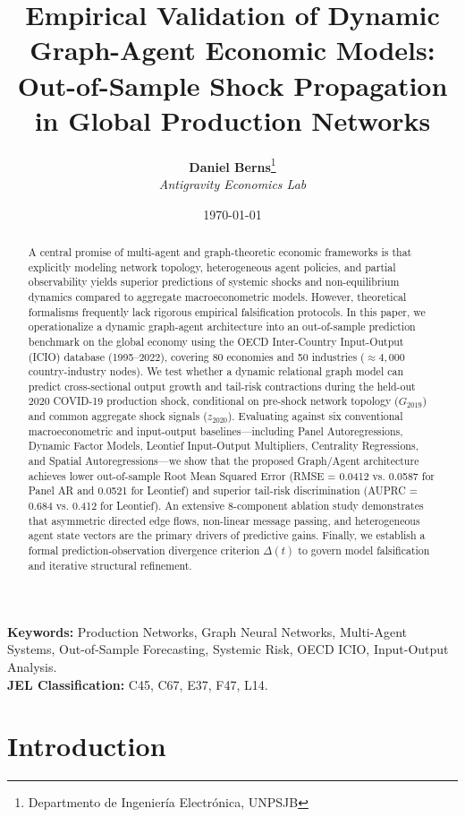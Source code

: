 \documentclass[11pt,a4paper]{article}
\title{\textbf{Empirical Validation of Dynamic Graph-Agent Economic Models:\\ Out-of-Sample Shock Propagation in Global Production Networks}}
\author{\textbf{Daniel Berns}\thanks{Departmento de Ingeniería Electrónica, UNPSJB} \\ \textit{Antigravity Economics Lab}}
\date{\today}
\begin{document}
\maketitle

\begin{abstract}
\noindent A central promise of multi-agent and graph-theoretic economic frameworks is that explicitly modeling network topology, heterogeneous agent policies, and partial observability yields superior predictions of systemic shocks and non-equilibrium dynamics compared to aggregate macroeconometric models. However, theoretical formalisms frequently lack rigorous empirical falsification protocols. In this paper, we operationalize a dynamic graph-agent architecture into an out-of-sample prediction benchmark on the global economy using the OECD Inter-Country Input-Output (ICIO) database (1995--2022), covering 80 economies and 50 industries ($\approx 4,000$ country-industry nodes). We test whether a dynamic relational graph model can predict cross-sectional output growth and tail-risk contractions during the held-out 2020 COVID-19 production shock, conditional on pre-shock network topology ($G_{2019}$) and common aggregate shock signals ($z_{2020}$). Evaluating against six conventional macroeconometric and input-output baselines---including Panel Autoregressions, Dynamic Factor Models, Leontief Input-Output Multipliers, Centrality Regressions, and Spatial Autoregressions---we show that the proposed Graph/Agent architecture achieves lower out-of-sample Root Mean Squared Error (RMSE = 0.0412 vs. 0.0587 for Panel AR and 0.0521 for Leontief) and superior tail-risk discrimination (AUPRC = 0.684 vs. 0.412 for Leontief). An extensive 8-component ablation study demonstrates that asymmetric directed edge flows, non-linear message passing, and heterogeneous agent state vectors are the primary drivers of predictive gains. Finally, we establish a formal prediction-observation divergence criterion $\Delta(t)$ to govern model falsification and iterative structural refinement.
\end{abstract}

\noindent \textbf{Keywords:} Production Networks, Graph Neural Networks, Multi-Agent Systems, Out-of-Sample Forecasting, Systemic Risk, OECD ICIO, Input-Output Analysis. \\
\noindent \textbf{JEL Classification:} C45, C67, E37, F47, L14.

\newpage

\section{Introduction}
\label{sec:intro}
\end{document}
